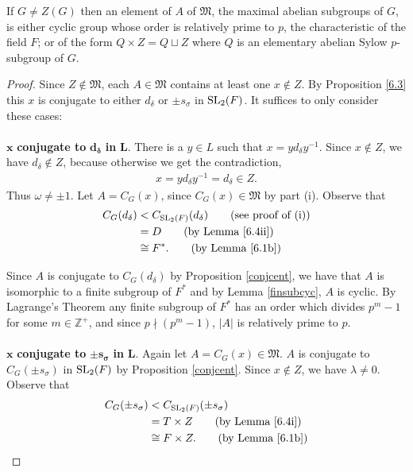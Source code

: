 \begin{lemma}
\label{MaximalAbelianSubgroup.IsCyclic_and_card_coprime_CharP_or_eq_Q_join_Z_of_center_ne}
\leanok
If $G \ne Z(G)$ then an element of $A$ of $\mathfrak{M}$, the maximal abelian subgroups of $G$, is either cyclic group whose order is relatively prime to $p$, the characteristic of the field $F$; or of the form $Q \times Z = Q \sqcup Z$ where $Q$ is an elementary abelian Sylow $p$-subgroup of $G$.
\end{lemma}
\begin{proof}
  Since $Z \not \in \mathfrak{M}$, each $A \in \mathfrak{M}$ contains at least one $x \not \in Z$. By Proposition  \ref{6.3} this $x$ is conjugate to either $d_\delta$ or $\pm s_\sigma$ in $\operatorname{SL}_2(F)$. It suffices to only consider these cases: \\
  \\
   \space $\pmb{x}$ \textbf{conjugate to} $\pmb{d_\delta}$ \textbf{in} $\pmb {L}$. There is a $y \in L$ such that $x = y d_\delta y^{-1}$. Since $x \not \in Z$, we have $d_\delta \not \in Z$, because otherwise we get the contradiction,
  \begin{align*} x =  y d_\delta y^{-1} = d_\delta \in Z.
  \end{align*}
  Thus $\omega \neq \pm 1$. Let $A = C_G(x)$, since $C_G(x) \in \mathfrak{M}$ by part (i). Observe that
  \begin{align*}  C_G(d_\delta) &<  C_{\SL_2(F)}(d_\delta)  \tag{see proof of (i)}
  \\ &= D  \tag{by Lemma \ref{6.4ii}}
  \\ &\cong F^*.  \tag{by Lemma \ref{6.1b}}
  \end{align*}
  
  Since $A$ is conjugate to $C_G(d_\delta)$ by Proposition \ref{conjcent}, we have that $A$ is isomorphic to a finite subgroup of $F^*$ and by Lemma \ref{finsubcyc}, $A$ is cyclic. By Lagrange's Theorem any finite subgroup of $F^*$ has an order which divides $p^m - 1$ for some $m \in \mathbb{Z}^+$, and since $p \nmid (p^m - 1)$, $|A|$ is relatively prime to $p$. \\
  \\
   \space $\pmb{x}$ \textbf{conjugate to} $\pmb{\pm s_\sigma}$ \textbf{in} $\pmb{L}$. Again let $A = C_G(x) \in \mathfrak{M}$. $A$ is conjugate to $C_G({\pm s_\sigma})$ in $\operatorname{SL}_2(F)$ by Proposition \ref{conjcent}. Since $x \notin Z$, we have $\lambda \neq 0$. Observe that
  \begin{align*}  C_G({\pm s_\sigma}) &<  C_{\SL_2(F)}({\pm s_\sigma})
  \\&= T \times Z  \tag{by Lemma \ref{6.4i}}
  \\&\cong F \times Z. \tag{by Lemma \ref{6.1b}}
  \end{align*}
  

\end{proof}
